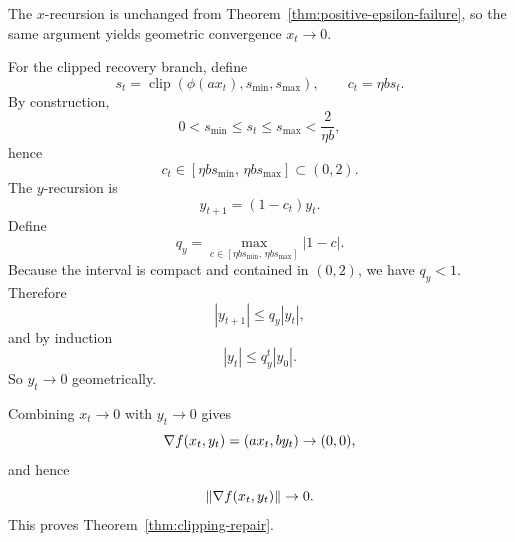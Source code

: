 The $x$-recursion is unchanged from
Theorem~\ref{thm:positive-epsilon-failure}, so the same argument yields
geometric convergence $x_t\to 0$.

For the clipped recovery branch, define
\[
s_t=\operatorname{clip}\!\left(\phi(a x_t),s_{\min},s_{\max}\right),
\qquad
c_t=\eta b s_t.
\]
By construction,
\[
0<s_{\min}\le s_t\le s_{\max}<\frac{2}{\eta b},
\]
hence
\[
c_t\in[\eta b s_{\min},\,\eta b s_{\max}]\subset (0,2).
\]
The $y$-recursion is
\[
y_{t+1}=(1-c_t)y_t.
\]
Define
\[
q_y=\max_{c\in[\eta b s_{\min},\,\eta b s_{\max}]}|1-c|.
\]
Because the interval is compact and contained in $(0,2)$, we have $q_y<1$.
Therefore
\[
|y_{t+1}|\le q_y |y_t|,
\]
and by induction
\[
|y_t|\le q_y^t |y_0|.
\]
So $y_t\to 0$ geometrically.

Combining $x_t\to 0$ with $y_t\to 0$ gives
\[
\nabla f(x_t,y_t)=(a x_t,b y_t)\to (0,0),
\]
and hence
\[
\left\lVert \nabla f(x_t,y_t) \right\rVert\to 0.
\]
This proves Theorem~\ref{thm:clipping-repair}.
